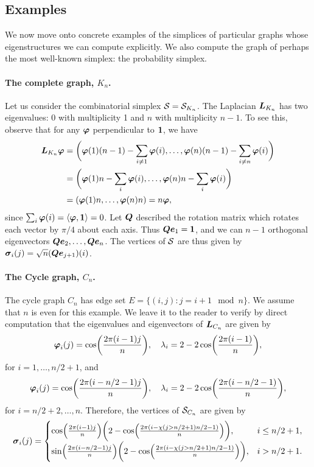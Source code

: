 \subsection{Examples}
\label{sec:examples}

We now move onto concrete examples of the simplices of particular graphs whose eigenstructures we can compute explicitly. We also compute the graph of perhaps the most well-known simplex:  the probability simplex. 

\paragraph{The complete graph, $K_n$.}
Let us consider the combinatorial simplex $\mathcal{S}=\mathcal{S}_{K_n}$.  The Laplacian $\vb*{L}_{K_n}$ has two eigenvalues: 0 with multiplicity 1 and $n$ with multiplicity $n-1$. To see this, observe that for any $\vb*{\varphi}$ perpendicular to $\vb{1}$, we have 
\begin{align*}
\vb*{L}_{K_n}\vb*{\varphi} &= \bigg(\vb*{\varphi}(1)(n-1)-\sum_{i\neq 1}\vb*{\varphi}(i),\dots,\vb*{\varphi}(n)(n-1)-\sum_{i\neq n}\vb*{\varphi}(i)\bigg) \\
&= \bigg(\vb*{\varphi}(1)n - \sum_i \vb*{\varphi}(i), \dots,\vb*{\varphi}(n)n - \sum_i \vb*{\varphi}(i)\bigg) \\
&= (\vb*{\varphi}(1)n,\dots,\vb*{\varphi}(n)n) = n\vb*{\varphi},
\end{align*}
since $\sum_i\vb*{\varphi}(i)=\langle \vb*{\varphi},\vb{1}\rangle =0$. Let $\vb*{Q}$  described the rotation matrix which rotates each vector  by $\pi/4$  about each axis. Thus $\vb*{Q}\vb*{e}_1=\vb{1}$, and we can $n-1$ orthogonal eigenvectors $\vb*{Q}\vb*{e}_2,\dots,\vb*{Q}\vb*{e}_n$. The vertices of $\mathcal{S}$  are thus given by $\vb*{\sigma}_i(j) = \sqrt{n}(\vb*{Q}\vb*{e}_{j+1})(i)$. 

\paragraph{The Cycle graph,  $C_n$.}
The cycle graph $C_n$ has edge set $E=\{(i,j):j=i+1\mod n\}$. We assume that $n$ is even for this example. 
We leave it to the reader to verify by direct computation  that the eigenvalues  and eigenvectors of $\vb*{L}_{C_n}$ are given by 
\[\vb*{\varphi}_i(j) = \cos(\frac{2\pi(i-1)j}{n}),\quad \lambda_i = 2-2\cos(\frac{2\pi(i-1)}{n}),\]
for $i=1,\dots,n/2+1$, and 
\[\vb*{\varphi}_i(j) = \cos(\frac{2\pi(i-n/2-1)j}{n}),\quad \lambda_i = 2-2\cos(\frac{2\pi(i-n/2-1)}{n}),\]
for $i=n/2+2,\dots,n$. Therefore,  the vertices of $\mathcal{S}_{C_n}$ are given by  
\begin{equation*}
\vb*{\sigma}_i(j) = \begin{cases}
\cos(\frac{2\pi(i-1)j}{n})\bigg(2-\cos(\frac{2\pi(i-\chi(j>n/2+1)n/2 -1)}{n})\bigg),& i\leq n/2+1, \\
\sin(\frac{2\pi(i-n/2-1)j}{n})\bigg(2-\cos(\frac{2\pi(i-\chi(j>n/2+1)n/2 -1)}{n})\bigg),& i> n/2+1.
\end{cases}
\end{equation*}


